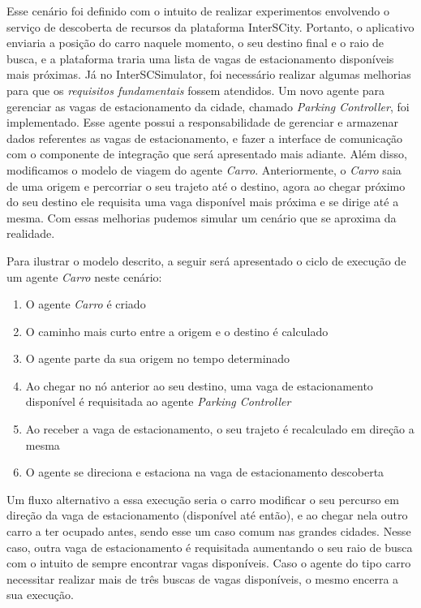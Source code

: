 Esse cenário foi definido com o intuito de realizar experimentos envolvendo o serviço de descoberta de recursos da plataforma InterSCity.
Portanto, o aplicativo enviaria a posição do carro naquele momento, o seu destino final e o raio de busca, e a plataforma traria uma lista de vagas de estacionamento
disponíveis mais próximas.
Já no InterSCSimulator, foi necessário realizar algumas melhorias para que os \textit{requisitos fundamentais} fossem atendidos.
Um novo agente para gerenciar as vagas de estacionamento da cidade, chamado \textit{Parking Controller}, foi implementado.
Esse agente possui a responsabilidade de gerenciar e armazenar dados referentes as vagas de estacionamento, e fazer a interface de comunicação com o componente de
integração que será apresentado mais adiante.
Além disso, modificamos o modelo de viagem do agente \textit{Carro}.
Anteriormente, o \textit{Carro} saia de uma origem e percorriar o seu trajeto até o destino, agora ao chegar próximo do seu destino ele requisita uma vaga disponível mais
próxima e se dirige até a mesma.
Com essas melhorias pudemos simular um cenário que se aproxima da realidade.

Para ilustrar o modelo descrito, a seguir será apresentado o ciclo de execução de um agente \textit{Carro} neste cenário:

\begin{enumerate}
    \item O agente \textit{Carro} é criado

    \item O caminho mais curto entre a origem e o destino é calculado

    \item O agente parte da sua origem no tempo determinado

    \item Ao chegar no nó anterior ao seu destino, uma vaga de estacionamento disponível é requisitada ao agente \textit{Parking Controller}

    \item Ao receber a vaga de estacionamento, o seu trajeto é recalculado em direção a mesma

    \item O agente se direciona e estaciona na vaga de estacionamento descoberta 
\end{enumerate}

Um fluxo alternativo a essa execução seria o carro modificar o seu percurso em direção da vaga de estacionamento (disponível até então), e ao chegar nela outro
carro a ter ocupado antes, sendo esse um caso comum nas grandes cidades.
Nesse caso, outra vaga de estacionamento é requisitada aumentando o seu raio de busca com o intuito de sempre encontrar vagas disponíveis.
Caso o agente do tipo carro necessitar realizar mais de três buscas de vagas disponíveis, o mesmo encerra a sua execução.

